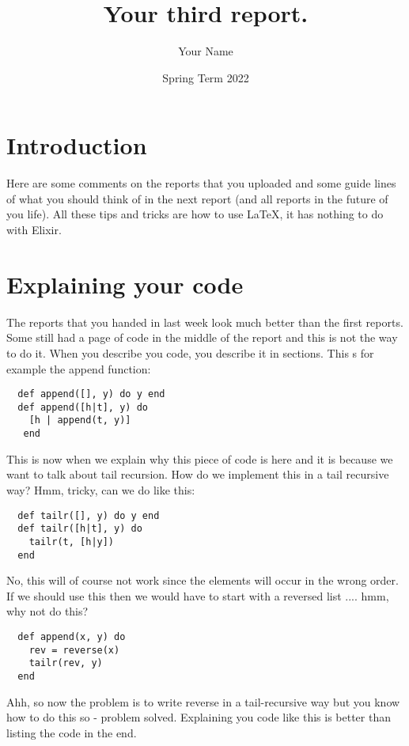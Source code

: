 \documentclass[a4paper,11pt]{article}
\begin{document}
\title{
    \textbf{Your third report.}
}
\author{Your Name}
\date{Spring Term 2022}

\maketitle

\section*{Introduction}

Here are some comments on the reports that you uploaded and some
guide lines of what you should think of in the next report (and all
reports in the future of you life). All these tips and tricks are how
to use \LaTeX, it has nothing to do with Elixir.

\section*{Explaining your code}

The reports that you handed in last week look much better than the
first reports. Some still had a page of code in the middle of the
report and this is not the way to do it. When you describe you code,
you describe it in sections. This s for example the append function:

\begin{verbatim}
  def append([], y) do y end
  def append([h|t], y) do 
    [h | append(t, y)]
   end
\end{verbatim}

This is now when we explain why this piece of code is here and it is
because we want to talk about tail recursion. How do we implement
this in a tail recursive way? Hmm, tricky, can we do like this:

\begin{verbatim}
  def tailr([], y) do y end
  def tailr([h|t], y) do 
    tailr(t, [h|y])
  end
\end{verbatim}

No, this will of course not work since the elements will occur in the
wrong order. If we should use this then we would have to start with a
reversed list .... hmm, why not do this?

\begin{verbatim}
  def append(x, y) do 
    rev = reverse(x)
    tailr(rev, y) 
  end
\end{verbatim}

Ahh, so now the problem is to write reverse in a tail-recursive way
but you know how to do this so - problem solved. Explaining you code
like this is better than listing the code in the end. 
\end{document}
